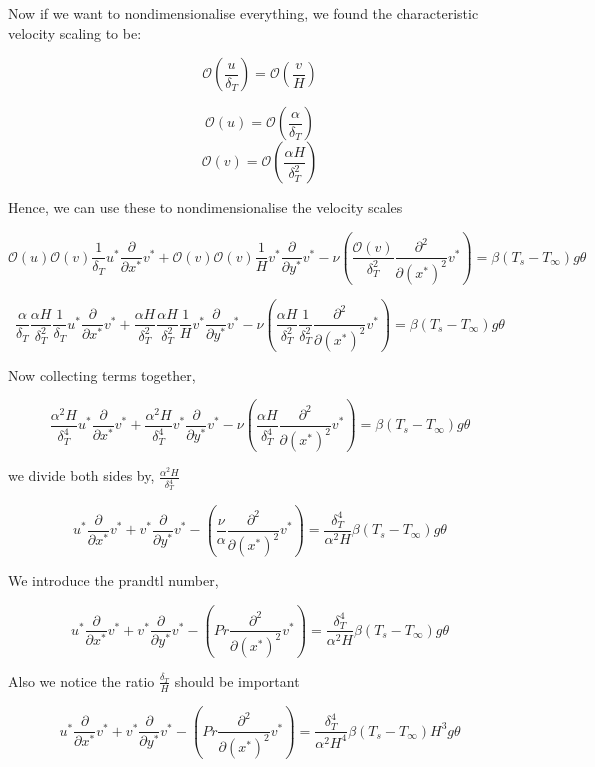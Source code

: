 \documentclass[11pt]{article}
\begin{document}
Now if we want to nondimensionalise everything, we found the characteristic velocity scaling to be:

$$\mathcal{O}(\frac{u}{\delta_T}) = \mathcal{O}(\frac{v}{H})$$

$$ \mathcal{O}( u ) = \mathcal{O}(\frac{\alpha}{\delta_T})$$
$$ \mathcal{O}(v ) = \mathcal{O}( \frac{\alpha H}{\delta_T^2})$$

Hence, we can use these to nondimensionalise the velocity scales

$$  \mathcal{O}(u) \mathcal{O}(v) \frac{1}{\delta_T} u^* \frac{\partial}{\partial x^*} v^* +  \mathcal{O}(v) \mathcal{O}(v) \frac{1}{H} v^* \frac{\partial}{\partial y^*} v^*  -\nu ( \frac{\mathcal{O}(v)}{\delta_T^2} \frac{\partial^2}{\partial (x^*)^2} v^* ) = \beta(T_s-T_\infty) g \theta $$

$$  \frac{\alpha}{\delta_T} \frac{\alpha H}{\delta_T^2} \frac{1}{\delta_T} u^* \frac{\partial}{\partial x^*} v^* +  \frac{\alpha H}{\delta_T^2} \frac{\alpha H}{\delta_T^2} \frac{1}{H} v^* \frac{\partial}{\partial y^*} v^*  -\nu ( \frac{\alpha H}{\delta_T^2} \frac{1}{\delta_T^2} \frac{\partial^2}{\partial (x^*)^2} v^* ) = \beta(T_s-T_\infty) g \theta $$

Now collecting terms together,

$$  \frac{\alpha^2 H}{\delta_T^4}  u^* \frac{\partial}{\partial x^*} v^* +  \frac{\alpha^2 H}{\delta_T^4} v^* \frac{\partial}{\partial y^*} v^*  -\nu ( \frac{\alpha H}{\delta_T^4} \frac{\partial^2}{\partial (x^*)^2} v^* ) = \beta(T_s-T_\infty) g \theta $$


we divide both sides by, $\frac{\alpha^2 H}{\delta_T^4}$

$$   u^* \frac{\partial}{\partial x^*} v^* +    v^* \frac{\partial}{\partial y^*} v^*  -  ( \frac{\nu}{\alpha} \frac{\partial^2}{\partial (x^*)^2} v^* ) = \frac{\delta_T^4}{\alpha^2 H} \beta(T_s-T_\infty) g \theta $$

We introduce the prandtl number,

$$   u^* \frac{\partial}{\partial x^*} v^* +    v^* \frac{\partial}{\partial y^*} v^*  -  ( Pr \frac{\partial^2}{\partial (x^*)^2} v^* ) = \frac{\delta_T^4}{\alpha^2 H} \beta(T_s-T_\infty) g \theta $$

Also we notice the ratio $\frac{\delta_T}{H}$ should be important

$$   u^* \frac{\partial}{\partial x^*} v^* +    v^* \frac{\partial}{\partial y^*} v^*  -  ( Pr \frac{\partial^2}{\partial (x^*)^2} v^* ) = \frac{\delta_T^4}{\alpha^2 H^4} \beta(T_s-T_\infty) H^3 g \theta $$
\end{document}

